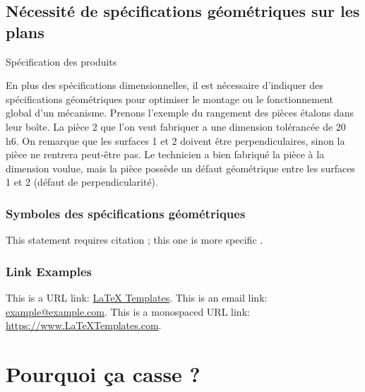 \documentclass[
	11pt, %
	fleqn, %
	a4paper, %
]{LegrandOrangeBook}
\begin{document}

\chapter{Nécessité de spécifications géométriques sur les plans}
\begin{corollary}[S6.1]
Spécification des produits
\end{corollary}

En plus des spécifications dimensionnelles, il est nécessaire d’indiquer des spécifications géométriques pour optimiser le montage ou le fonctionnement global d’un mécanisme.
Prenons l’exemple du rangement des pièces étalons dans leur boîte. La pièce 2 que l’on veut fabriquer a une dimension tolérancée de 20 h6.
On remarque que les surfaces 1 et 2 doivent être perpendiculaires, sinon la pièce ne rentrera peut-être pas. Le technicien a bien fabriqué la pièce à la dimension voulue, mais la pièce possède un défaut géométrique entre les surfaces 1 et 2 (défaut de perpendicularité).

\section{Symboles des spécifications géométriques}

This statement requires citation \cite{Smith:2022jd}; this one is more specific \cite[162]{Smith:2021qr}.


\section{Link Examples}

This is a URL link: \href{https://www.latextemplates.com}{LaTeX Templates}. This is an email link: \href{mailto:example@example.com}{example@example.com}. This is a monospaced URL link: \url{https://www.LaTeXTemplates.com}.


\part{Pourquoi ça casse ?}
\end{document}
